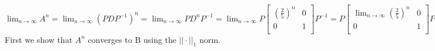 \documentclass[12pt]{article}
\newenvironment{problems}{\begin{list}{}{\setlength{\labelwidth}{.7in}}}{\end{list}}
\begin{document}
\begin{problems}
$\displaystyle\lim_{n \to \infty}A^n = \displaystyle\lim_{n \to \infty}(PDP^{-1})^n = \displaystyle\lim_{n \to \infty}PD^nP^{-1} = \displaystyle\lim_{n \to \infty}P\begin{bmatrix}
   (\frac{2}{5})^n  & 0\\
   0  &  1 \\
  \end{bmatrix} P^{-1} = P\begin{bmatrix}
    \displaystyle\lim_{n \to \infty}(\frac{2}{5})^n  & 0\\
   0  &  1 \\
  \end{bmatrix}P^{-1} =P
  \begin{bmatrix}
   0  & 0\\
   0  &  1 \\
  \end{bmatrix}P^{-1} = B$\\
  
  First we show that $A^n$ converges to B using the $||\cdot ||_1$ norm.\\
  

\end{problems}
\end{document}
